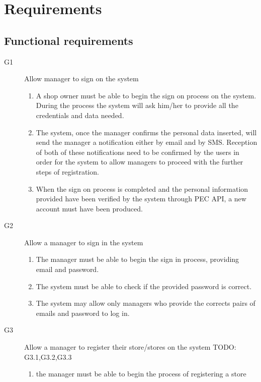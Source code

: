\section{Requirements}
\label{sect:Specificrequirements}

\subsection{Functional requirements}
\label{subsect:functionalrequirements}

\begin{description}
    \item [G1] Allow manager to sign on the system
        \begin{enumerate}[label=\textbf{R\arabic*}]
            \item A shop owner must be able to begin the sign on process on the system. During the process the system will ask him/her to provide all the credentials and data needed. 
            \item The system, once the manager confirms the personal data inserted, will send the manager a notification either by email and by SMS. Reception of both of these notifications need to be confirmed by the users in order for the system to allow managers to proceed with the further steps of registration.
            \item When the sign on process is completed and the personal information provided have been verified by the system through PEC API, a new account must have been produced.
        \end{enumerate}
    \item [G2] Allow a manager to sign in the system
        \begin{enumerate}[resume*]
            \item The manager must be able to begin the sign in process, providing email and password.
            \item The system must be able to check if the provided password is correct.
            \item The system may allow only managers who provide the corrects pairs of emails and password to log in.
        \end{enumerate}
    \item [G3] Allow a manager to register their store/stores on the system TODO: G3.1,G3.2,G3.3
        \begin{enumerate}[resume*]
            \item the manager must be able to begin the process of registering a store 

\end{enumerate}
\end{description}
